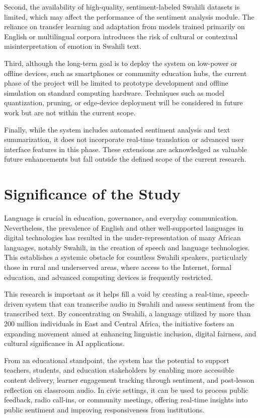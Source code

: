 \noindent Second, the availability of high-quality, sentiment-labeled Swahili datasets is limited, which may affect the performance of the sentiment analysis module. The reliance on transfer learning and adaptation from models trained primarily on English or multilingual corpora introduces the risk of cultural or contextual misinterpretation of emotion in Swahili text.

\noindent Third, although the long-term goal is to deploy the system on low-power or offline devices, such as smartphones or community education hubs, the current phase of the project will be limited to prototype development and offline simulation on standard computing hardware. Techniques such as model quantization, pruning, or edge-device deployment will be considered in future work but are not within the current scope.


\noindent Finally, while the system includes automated sentiment analysis and text summarization, it does not incorporate real-time translation or advanced user interface features in this phase. These extensions are acknowledged as valuable future enhancements but fall outside the defined scope of the current research.


\section{Significance of the Study}
Language is crucial in education, governance, and everyday communication. Nevertheless, the prevalence of English and other well-supported languages in digital technologies has resulted in the under-representation of many African languages, notably Swahili, in the creation of speech and language technologies. This establishes a systemic obstacle for countless Swahili speakers, particularly those in rural and underserved areas, where access to the Internet, formal education, and advanced computing devices is frequently restricted.

\noindent This research is important as it helps fill a void by creating a real-time, speech-driven system that can transcribe audio in Swahili and assess sentiment from the transcribed text. By concentrating on Swahili, a language utilized by more than 200 million individuals in East and Central Africa, the initiative fosters an expanding movement aimed at enhancing linguistic inclusion, digital fairness, and cultural significance in AI applications.

\noindent From an educational standpoint, the system has the potential to support teachers, students, and education stakeholders by enabling more accessible content delivery, learner engagement tracking through sentiment, and post-lesson reflection on classroom audio. In civic settings, it can be used to process public feedback, radio call-ins, or community meetings, offering real-time insights into public sentiment and improving responsiveness from institutions.

